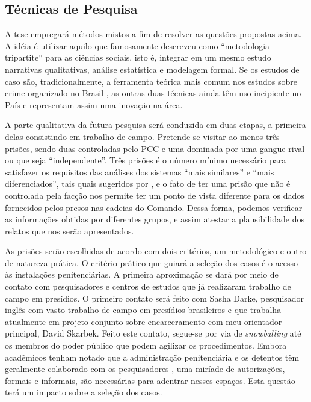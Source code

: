 \documentclass[a4paper,11pt]{article}
\begin{document}
\subsection{Técnicas de Pesquisa}

A tese empregará métodos mistos a fim de resolver as questões propostas acima. A idéia é utilizar aquilo que \citet[165]{laitin2003perestroikan} famosamente descreveu como ``metodologia tripartite'' para as ciências sociais, isto é, integrar em um mesmo estudo narrativas qualitativas, análise estatística e modelagem formal. Se os estudos de caso são, tradicionalmente, a ferramenta teórica mais comum nos estudos sobre crime organizado no Brasil \citep[366]{dias2011pulverizaccao}, as outras duas técnicas ainda têm uso incipiente no País e representam assim uma inovação na área. 

A parte qualitativa da futura pesquisa será conduzida em duas etapas, a primeira delas consistindo em trabalho de campo. Pretende-se visitar ao menos três prisões, sendo duas controladas pelo PCC e uma dominada por uma gangue rival ou que seja ``independente''.  Três prisões é o número mínimo necessário para satisfazer os requisitos das análises dos sistemas ``mais similares'' e ``mais diferenciados'', tais quais sugeridos por \cite{przeworski1970logic}, e o fato de ter uma prisão que não é controlada pela facção nos permite ter um ponto de vista diferente para os dados fornecidos pelos presos nas cadeias do Comando. Dessa forma, podemos verificar as informações obtidas por diferentes grupos, e assim atestar a plausibilidade dos relatos que nos serão apresentados. 

As prisões serão escolhidas de acordo com dois critérios, um metodológico e outro de natureza prática. O critério prático que guiará a seleção dos casos é o acesso às instalações penitenciárias. A primeira aproximação se dará por meio de contato com pesquisadores e centros de estudos que já realizaram trabalho de campo em presídios. O primeiro contato será feito com Sasha Darke, pesquisador inglês com vasto trabalho de campo em presídios brasileiros e que trabalha atualmente em projeto conjunto sobre encarceramento com meu orientador principal, David Skarbek. Feito este contato, segue-se por via de \textit{snowballing} até os membros do poder público que podem agilizar os procedimentos. Embora acadêmicos tenham notado que a administração penitenciária e os detentos têm geralmente colaborado com os pesquisadores \citep[35]{dias2011pulverizaccao}, uma miríade de autorizações, formais e informais, são necessárias para adentrar nesses espaços. Esta questão terá um impacto sobre a seleção dos casos.
\end{document}
